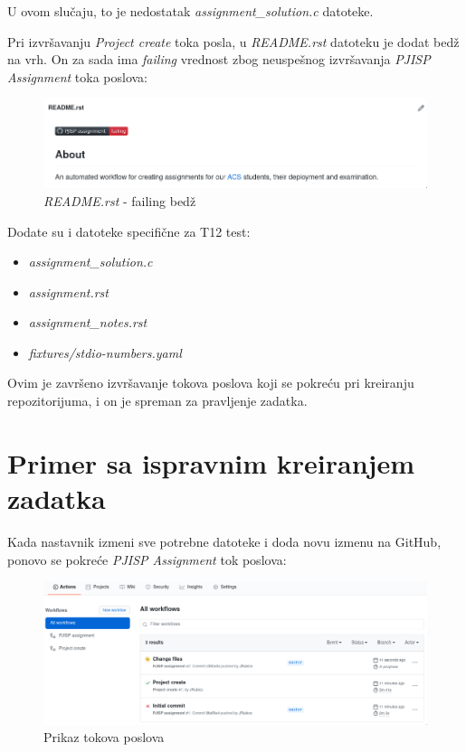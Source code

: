 \documentclass[12pt]{report}
\begin{document}
U ovom slučaju, to je nedostatak \textit{assignment\_solution.c} datoteke.

Pri izvršavanju \textit{Project create} toka posla, u \textit{README.rst} datoteku je dodat bedž na vrh. On za sada ima \textit{failing} vrednost zbog neuspešnog izvršavanja \textit{PJISP Assignment} toka poslova:

\begin{figure}[H]
    \centering
    \includegraphics[width=\linewidth]{images/12.png}
    \caption{\textit{README.rst} - failing bedž}
\end{figure}

Dodate su i datoteke specifične za T12 test:

\begin{itemize}
    \item \textit{assignment\_solution.c}
    \item \textit{assignment.rst}
    \item \textit{assignment\_notes.rst}
    \item \textit{fixtures/stdio-numbers.yaml}
\end{itemize}

Ovim je završeno izvršavanje tokova poslova koji se pokreću pri kreiranju repozitorijuma, i on je spreman za pravljenje zadatka.

\section{Primer sa ispravnim kreiranjem zadatka}

Kada nastavnik izmeni sve potrebne datoteke i doda novu izmenu na GitHub, ponovo se pokreće \textit{PJISP Assignment} tok poslova:

\begin{figure}[H]
    \centering
    \includegraphics[width=\linewidth]{images/13.png}
    \caption{Prikaz tokova poslova}
\end{figure}
\end{document}
